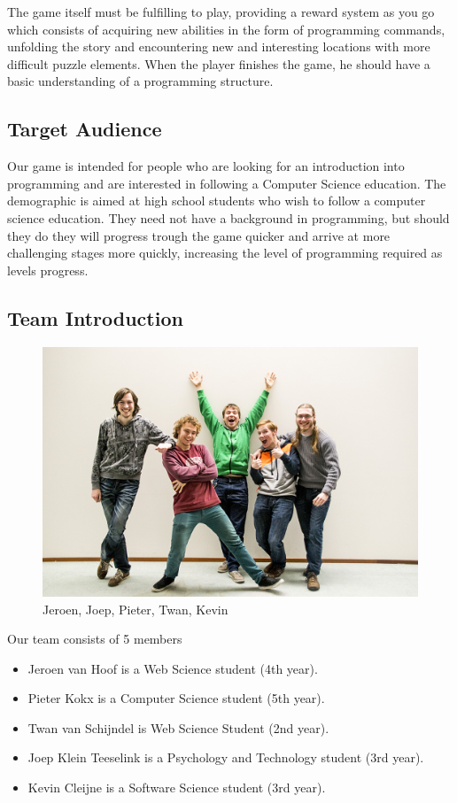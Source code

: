 \documentclass[a4paper,twoside,12pt]{article}
\begin{document}
The game itself must be fulfilling to play, providing a reward system as you go which consists of acquiring new abilities in the form of programming commands, unfolding the story and encountering new and interesting locations with more difficult puzzle elements. When the player finishes the game, he should have a basic understanding of a programming structure.


\subsection{Target Audience}
Our game is intended for people who are looking for an introduction into programming and are interested in following a Computer Science education.
The demographic is aimed at high school students who wish to follow a computer science education. They need not have a background in programming, but should they do they will progress trough the game quicker and arrive at more challenging stages more quickly, increasing the level of programming required as levels progress.

\subsection{Team Introduction}
\begin{figure}[h]
\centering
\includegraphics[scale=0.4]{group}
\caption{Jeroen, Joep, Pieter, Twan, Kevin}
\end{figure}
Our team consists of 5 members

\begin{itemize}
\item Jeroen van Hoof is a Web Science student (4th year).
\item Pieter Kokx is a Computer Science student (5th year).
\item Twan van Schijndel is Web Science Student (2nd year).
\item Joep Klein Teeselink is a Psychology and Technology student (3rd year).
\item Kevin Cleijne is a Software Science student (3rd year).
\end{itemize}
\end{document}
